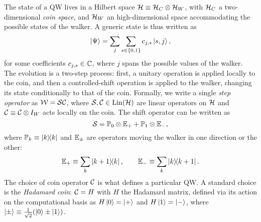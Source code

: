 The state of a QW lives in a Hilbert space ${\mathcal{H}}\equiv{\mathcal{H}}_C\otimes{\mathcal{H}}_W$, with ${\mathcal{H}}_C$ a two-dimensional \emph{coin space}, and ${\mathcal{H}}_W$ an high-dimensional space accommodating the possible states of the walker.
A generic state is thus written as
\begin{equation}
    \ket\Psi = \sum_j \sum_{s\in\{0,1\}} c_{j,s} \ket{s, j},
\end{equation}
for some coefficients $c_{j,s}\in{\mathbb{C}}$, where $j$ spans the possible values of the walker.
The evolution is a two-step process:
first, a unitary operation is applied locally to the coin,
and then a controlled-shift operation is applied to the walker, changing its state conditionally to that of the coin.
Formally, we write a single \textit{step operator} as ${\mathcal{W}}={\mathcal{S}}{\mathcal{C}}$, where ${\mathcal{S}},{\mathcal{C}}\in\operatorname{Lin}({\mathcal{H}})$ are linear operators on ${\mathcal{H}}$ and ${\mathcal{C}}\equiv{\mathcal{C}}\otimes I_W$ acts locally on the coin. The shift operator can be written as
\begin{equation}
    {\mathcal{S}} = {\mathbb{P}}_0\otimes {\mathbb{E}}_+ + {\mathbb{P}}_1\otimes {\mathbb{E}}_-,
    \label{eq:qws_shitty_definition_cshift}
\end{equation}
where ${\mathbb{P}}_k\equiv\ketbra k$ and ${\mathbb{E}}_\pm$ are operators moving the walker in one direction or the other:
\begin{equation}
    {\mathbb{E}}_+\equiv \sum_k \ketbra{k+1}{k},
    \qquad
    {\mathbb{E}}_-\equiv\sum_k\ketbra{k}{k+1}.
\end{equation}
The choice of coin operator ${\mathcal{C}}$ is what defines a particular \ac{QW}.
A standard choice is the \textit{Hadamard coin}: ${\mathcal{C}}=H$ with $H$ the Hadamard matrix, defined via its action on the computational basis as
$H\ket0=\ket+$ and $H\ket1=\ket-$, where $\ket\pm\equiv\frac{1}{\sqrt2}(\ket0\pm\ket1)$.

